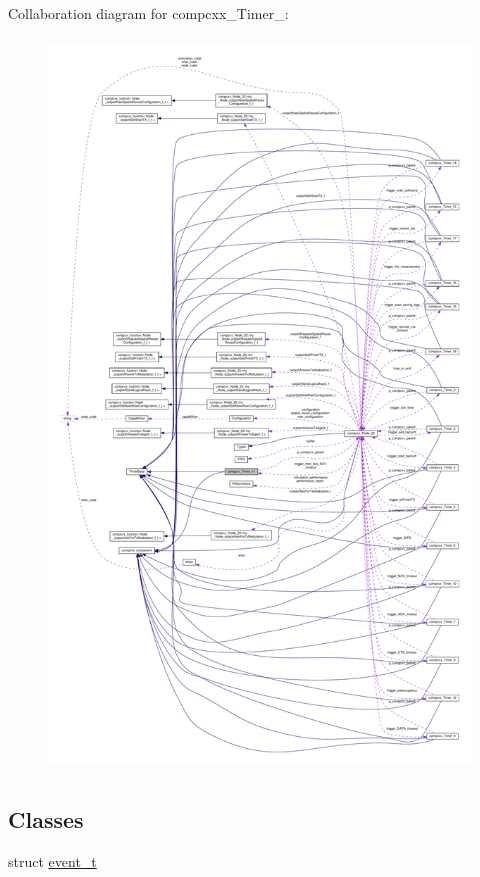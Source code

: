 Collaboration diagram for compcxx\+\_\+\+Timer\+\_\+:\nopagebreak
\begin{figure}[H]
\begin{center}
\leavevmode
\includegraphics[height=550pt]{classcompcxx__Timer__11__coll__graph}
\end{center}
\end{figure}
\subsection*{Classes}
\begin{DoxyCompactItemize}
\item 
struct \hyperlink{structcompcxx__Timer__11_1_1event__t}{event\+\_\+t}
\end{DoxyCompactItemize}
